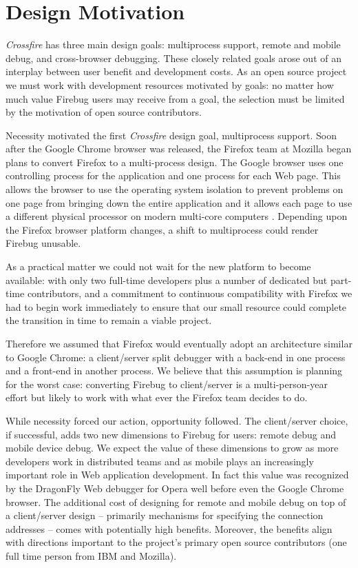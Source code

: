 \section{Design Motivation}
\textit{Crossfire} has three main design goals: multiprocess support, remote and
mobile debug, and cross-browser debugging. These closely related goals arose out
of an interplay between user benefit and development costs. As an open source
project we must work with development resources motivated by goals: no matter
how much value Firebug users may receive from a goal, the selection must be
limited by the motivation of open source contributors.

Necessity motivated the first \textit{Crossfire} design goal, multiprocess
support. Soon after the Google Chrome browser was released, the Firefox team at
Mozilla began plans to convert Firefox to a multi-process design.  The Google
browser uses one controlling process for the application and one process for
each Web page.  This allows the browser to use the operating system isolation to
prevent problems on one page from bringing down the entire application and it
allows each page to use a different physical processor on modern multi-core
computers \cite{GoogleChrome}.  Depending upon the Firefox browser platform
changes, a shift to multiprocess could render Firebug unusable.

 As a practical
matter we could not wait for the new platform to become available: with only
two full-time developers plus a number of dedicated but part-time contributors,
and a commitment to continuous compatibility with Firefox we had to begin work
immediately to ensure that our small resource could complete the transition in
time to remain a viable project.

Therefore we assumed that Firefox would eventually adopt
an architecture similar to Google Chrome: a client/server split debugger with a
back-end in one process and a front-end in another process.  We believe
that this assumption is planning for the worst case: converting Firebug to
client/server is a multi-person-year effort but likely to work with what
ever the Firefox team decides to do.

While necessity forced our action, opportunity followed. The client/server
choice, if successful, adds two new dimensions to Firebug for users: remote
debug and mobile device debug. We expect the value of these dimensions to grow
as more developers work in distributed teams and as mobile plays an increasingly
important role in Web application development.  In fact this value was
recognized by the DragonFly Web debugger for Opera well before even the Google
Chrome browser. The additional cost of designing for remote and mobile debug
on top of a client/server design -- primarily mechanisms for specifying the
connection addresses -- comes with potentially high benefits.  Moreover, the
benefits align with directions important to the project's primary open source
contributors (one full time person from IBM and Mozilla).

